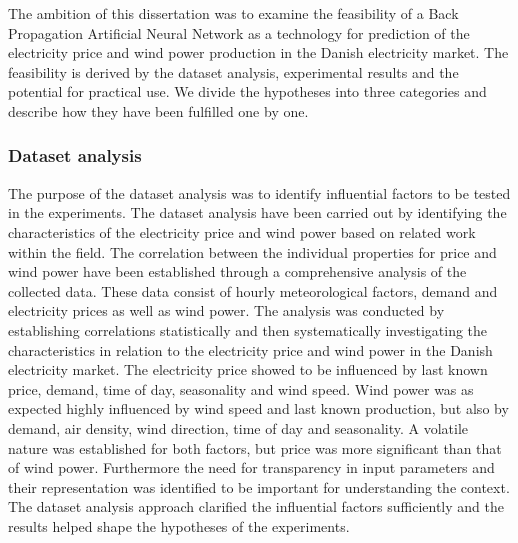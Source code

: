 The ambition of this dissertation was to examine the feasibility of a Back Propagation Artificial Neural Network as a technology for prediction of the electricity price and wind power production in the Danish electricity market. The feasibility is derived by the dataset analysis, experimental results and the potential for practical use. We divide the hypotheses into three categories and describe how they have been fulfilled one by one.


\subsubsection{Dataset analysis}
The purpose of the dataset analysis was to identify influential factors to be tested in the experiments. The dataset analysis have been carried out by identifying the characteristics of the electricity price and wind power based on related work within the field. The correlation between the individual properties for price and wind power have been established through a comprehensive analysis of the collected data. These data consist of hourly meteorological factors, demand and electricity prices as well as wind power. The analysis was conducted by establishing correlations statistically and then systematically investigating the characteristics in relation to the electricity price and wind power in the Danish electricity market. The electricity price showed to be influenced by last known price, demand, time of day, seasonality and wind speed. Wind power was as expected highly influenced by wind speed and last known production, but also by demand, air density, wind direction, time of day and seasonality. A volatile nature was established for both factors, but price was more significant than that of wind power. Furthermore the need for transparency in input parameters and their representation was identified to be important for understanding the context. The dataset analysis approach clarified the influential factors sufficiently and the results helped shape the hypotheses of the experiments. 
